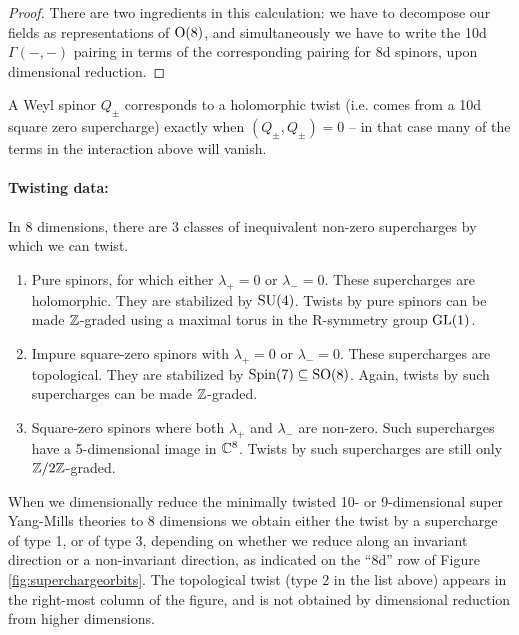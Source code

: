 \documentclass[10pt, oneside]{article}
\begin{document}
\begin{proof}
There are two ingredients in this calculation: we have to decompose our fields as representations of $\mathrm{O}(8)$, and simultaneously we have to write the 10d $\Gamma(-,-)$ pairing in terms of the corresponding pairing for 8d spinors, upon dimensional reduction. 
\end{proof}

\begin{remark}
A Weyl spinor $Q_\pm$ corresponds to a holomorphic twist (i.e. comes from a 10d square zero supercharge) exactly when $(Q_\pm,Q_\pm)=0$ -- in that case many of the terms in the interaction above will vanish.
\end{remark}

\vspace{-10pt}
\paragraph{Twisting data:}
In 8 dimensions, there are 3 classes of inequivalent non-zero supercharges by which we can twist.
\begin{enumerate}
 \item Pure spinors, for which either $\lambda_+ = 0$ or $\lambda_- = 0$.  These supercharges are holomorphic.  They are stabilized by $\mathrm{SU}(4)$.  Twists by pure spinors can be made $\mathbb Z$-graded using a maximal torus in the R-symmetry group $\mathrm{GL}(1)$.
 \item Impure square-zero spinors with $\lambda_+ = 0$ or $\lambda_- = 0$.  These supercharges are topological.  They are stabilized by $\mathrm{Spin}(7) \subseteq \mathrm{SO}(8)$.  Again, twists by such supercharges can be made $\mathbb Z$-graded.
 \item Square-zero spinors where both $\lambda_+$ and $\lambda_-$ are non-zero.  Such supercharges have a 5-dimensional image in $\mathbb C^8$.  Twists by such supercharges are still only $\mathbb Z/2\mathbb Z$-graded.
\end{enumerate}

When we dimensionally reduce the minimally twisted 10- or 9-dimensional super Yang-Mills theories to 8 dimensions we obtain either the twist by a supercharge of type 1, or of type 3, depending on whether we reduce along an invariant direction or a non-invariant direction, as indicated on the ``8d'' row of Figure \ref{fig:superchargeorbits}.  The topological twist (type 2 in the list above) appears in the right-most column of the figure, and is not obtained by dimensional reduction from higher dimensions.
\end{document}

